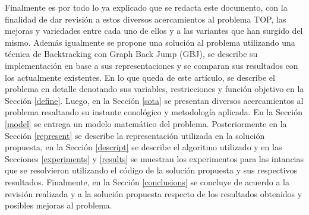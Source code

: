 Finalmente es por todo lo ya explicado que se redacta este documento, con la finalidad de dar revisi\'on a estos diversos acercamientos al problema TOP, las mejoras y variedades entre cada uno de ellos y a las variantes que han surgido del mismo. Adem\'as igualmente se propone una soluci\'on al problema utilizando una t\'ecnica de Backtracking con Graph Back Jump (GBJ), se describe su implementaci\'on en base a sus representaciones y se comparan sus resultados con los actualmente existentes. En lo que queda de este art\'iculo, se describe el problema en detalle denotando sus variables, restricciones y funci\'on objetivo en la Secci\'on \ref{define}. Luego, en la Secci\'on \ref{sota} se presentan diversos acercamientos al problema resaltando su instante conol\'ogico y metodolog\'ia aplicada. En la Secci\'on \ref{model} se entrega un modelo matem\'atico del problema. Posteriormente en la Secci\'on \ref{represent} se describe la representaci\'on utilizada en la soluci\'on propuesta, en la Secci\'on \ref{descript} se describe el algoritmo utilizado y en las Secciones \ref{experiments} y \ref{results} se muestran los experimentos para las intancias que se resolvieron utilizando el c\'odigo de la soluci\'on propuesta y sus respectivos resultados. Finalmente, en la Secci\'on \ref{conclusions} se concluye de acuerdo a la revisi\'on realizada y a la soluci\'on propuesta respecto de los resultados obtenidos y posibles mejoras al problema.